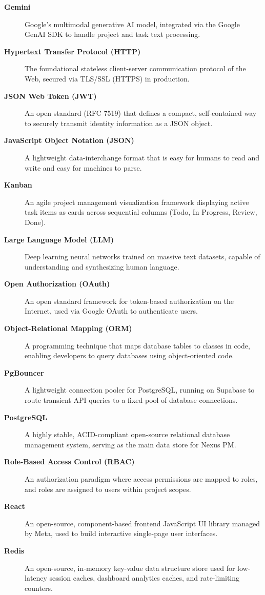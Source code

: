 \begin{description}
    \item[\textbf{Gemini}] Google's multimodal generative AI model, integrated via the Google GenAI SDK to handle project and task text processing.
    \item[\textbf{Hypertext Transfer Protocol (HTTP)}] The foundational stateless client-server communication protocol of the Web, secured via TLS/SSL (HTTPS) in production.
    \item[\textbf{JSON Web Token (JWT)}] An open standard (RFC 7519) that defines a compact, self-contained way to securely transmit identity information as a JSON object.
    \item[\textbf{JavaScript Object Notation (JSON)}] A lightweight data-interchange format that is easy for humans to read and write and easy for machines to parse.
    \item[\textbf{Kanban}] An agile project management visualization framework displaying active task items as cards across sequential columns (Todo, In Progress, Review, Done).
    \item[\textbf{Large Language Model (LLM)}] Deep learning neural networks trained on massive text datasets, capable of understanding and synthesizing human language.
    \item[\textbf{Open Authorization (OAuth)}] An open standard framework for token-based authorization on the Internet, used via Google OAuth to authenticate users.
    \item[\textbf{Object-Relational Mapping (ORM)}] A programming technique that maps database tables to classes in code, enabling developers to query databases using object-oriented code.
    \item[\textbf{PgBouncer}] A lightweight connection pooler for PostgreSQL, running on Supabase to route transient API queries to a fixed pool of database connections.
    \item[\textbf{PostgreSQL}] A highly stable, ACID-compliant open-source relational database management system, serving as the main data store for Nexus PM.
    \item[\textbf{Role-Based Access Control (RBAC)}] An authorization paradigm where access permissions are mapped to roles, and roles are assigned to users within project scopes.
    \item[\textbf{React}] An open-source, component-based frontend JavaScript UI library managed by Meta, used to build interactive single-page user interfaces.
    \item[\textbf{Redis}] An open-source, in-memory key-value data structure store used for low-latency session caches, dashboard analytics caches, and rate-limiting counters.

\end{description}
